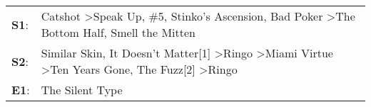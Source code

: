 \begin{supertabular}{p{0.03\textwidth}p{0.92\textwidth}}
 \textbf{S1}:  &                             Catshot\textsuperscript{} \textgreater \enspace Speak Up\textsuperscript{}, \enspace \#5\textsuperscript{}, \enspace Stinko's Ascension\textsuperscript{}, \enspace Bad Poker\textsuperscript{} \textgreater \enspace The Bottom Half\textsuperscript{}, \enspace Smell the Mitten\textsuperscript{}  \enspace  \\
 \textbf{S2}:  &  Similar Skin\textsuperscript{}, \enspace It Doesn't Matter[1]\textsuperscript{} \textgreater \enspace Ringo\textsuperscript{} \textgreater \enspace Miami Virtue\textsuperscript{} \textgreater \enspace Ten Years Gone\textsuperscript{}, \enspace The Fuzz[2]\textsuperscript{} \textgreater \enspace Ringo\textsuperscript{}  \enspace  \\
 \textbf{E1}:  &                                                                                                                                                                                                                                                                                                The Silent Type\textsuperscript{}  \enspace  \\
\end{supertabular}
